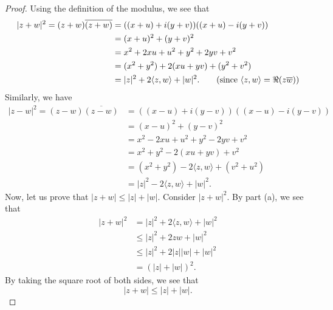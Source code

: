 \documentclass[a4paper]{article}
\begin{document}
\begin{enumerate}
\begin{proof}
                Using the definition of the modulus, we see that
                \begin{align*}
                    | z + w  |^{2} = (z+w) \overline{(z+w)} &= ((x+u) + i(y+v)) ((x+u) - i(y+v)) \\
                                                            &= (x+u)^{2} + (y +v)^{2} \\
                                                            &= x^{2} +  2xu + u^{2} + y^{2} + 2yv + v^{2} \\
                                                            &= (x^{2} + y^{2}) + 2 (xu + yv) + (y^{2} + v^{2}) \\
                                                            &= | z |^{2} + 2 \langle z , w \rangle + | w |^{2}. \tag{since \( \langle z , w \rangle = \Re(z \overline{w}) \)}
                \end{align*} 
                Similarly, we have
                \begin{align*}
                    | z - w  |^{2} = (z-w)\overline{(z-w)} &= ((x-u) + i (y - v)) ((x-u) - i (y - v)) \\
                                                           &= (x-u)^{2} + (y - v)^{2} \\
                                                           &=  x^{2} -2xu + u^{2} + y^{2} -2yv + v^{2} \\
                                                           &= x^{2} + y^{2} -2(xu + yv) + v^{2} \\
                                                           &= (x^{2}  + y^{2}) -2 \langle z , w \rangle + (v^{2} + u^{2}) \\ 
                                                           &= | z |^{2} - 2 \langle z , w \rangle + | w |^{2}.
\end{align*}
Now, let us prove that \( | z + w  | \leq | z  |  + | w |  \). Consider \( | z + w  |^{2} \). By part (a), we see that
\begin{align*}
    | z + w  |^{2} &= | z  |^{2} + 2 \langle z , w \rangle + | w |^{2} \\
                   &\leq | z |^{2} + 2 z  w + | w |^{2} \\ 
                   &\leq | z |^{2} + 2 | z | | w |  + | w |^{2} \\
                   &= (| z |  + | w | )^{2}.
\end{align*}
By taking the square root of both sides, we see that
\[  | z + w  | \leq | z  |  + | w |. \]

\end{proof}
\end{enumerate}
\end{document}
